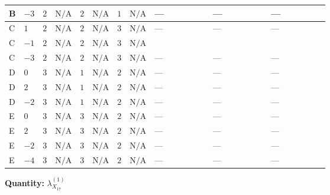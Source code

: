 \documentclass[8pt]{article}
\begin{document}
\begin{landscape}
\begin{longtable}{@{}llcccccc >{\raggedright\arraybackslash}p{0.21\linewidth} >{\raggedright\arraybackslash}p{0.21\linewidth} >{\raggedright\arraybackslash}p{0.21\linewidth}@{}}
\midrule
B & $-3$ & $2$ & $\text{N/A}$ & $2$ & $\text{N/A}$ & $1$ & $\text{N/A}$ & --- & --- & --- \\
\midrule
C & $1$ & $2$ & $\text{N/A}$ & $2$ & $\text{N/A}$ & $3$ & $\text{N/A}$ & --- & --- & --- \\
\midrule
C & $-1$ & $2$ & $\text{N/A}$ & $2$ & $\text{N/A}$ & $3$ & $\text{N/A}$ & \scriptsize\adjustbox{max width=\linewidth}{$\begin{gathered} +{\lambda_1} (4 {\lambda_{X_{17}}^{(1)}}-2 {\lambda_{H H^\dagger S_1^\dagger S_2^\dagger}^{\rm Cross}})\end{gathered}$} & \scriptsize\adjustbox{max width=\linewidth}{$\begin{gathered} +{\lambda_{HS_1}^{(1)}} (4 {\lambda_{X_{17}}^{(1)}}-6 {\lambda_{11}})\end{gathered}$} & \scriptsize\adjustbox{max width=\linewidth}{$\begin{gathered} +{\lambda_{HS_1}^{(A)}} \left(-{\lambda_{H H^\dagger S_1^\dagger S_2^\dagger}^{\rm Cross}}+\frac{{\lambda_{11}}}{2}-2 {\lambda_{X_{17}}^{(1)}}\right)\end{gathered}$} \\
\midrule
C & $-3$ & $2$ & $\text{N/A}$ & $2$ & $\text{N/A}$ & $3$ & $\text{N/A}$ & --- & --- & --- \\
\midrule
D & $0$ & $3$ & $\text{N/A}$ & $1$ & $\text{N/A}$ & $2$ & $\text{N/A}$ & --- & --- & --- \\
\midrule
D & $2$ & $3$ & $\text{N/A}$ & $1$ & $\text{N/A}$ & $2$ & $\text{N/A}$ & --- & --- & --- \\
\midrule
D & $-2$ & $3$ & $\text{N/A}$ & $1$ & $\text{N/A}$ & $2$ & $\text{N/A}$ & --- & --- & --- \\
\midrule
E & $0$ & $3$ & $\text{N/A}$ & $3$ & $\text{N/A}$ & $2$ & $\text{N/A}$ & --- & --- & --- \\
\midrule
E & $2$ & $3$ & $\text{N/A}$ & $3$ & $\text{N/A}$ & $2$ & $\text{N/A}$ & --- & --- & --- \\
\midrule
E & $-2$ & $3$ & $\text{N/A}$ & $3$ & $\text{N/A}$ & $2$ & $\text{N/A}$ & --- & --- & --- \\
\midrule
E & $-4$ & $3$ & $\text{N/A}$ & $3$ & $\text{N/A}$ & $2$ & $\text{N/A}$ & --- & --- & --- \\
\midrule
\bottomrule
\end{longtable}
\clearpage
\noindent\textbf{Quantity: }${\lambda_{X_{17}}^{(1)}}$\par\smallskip

\end{landscape}
\end{document}
